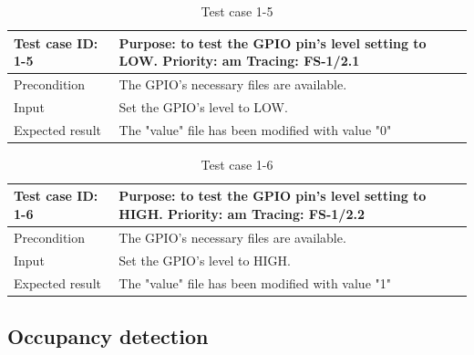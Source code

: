 \begin{table}[H]
	\caption{Test case 1-5}
	\label{table:TCase-FS1-5}
	\begin{center}
		\renewcommand{\arraystretch}{1.8}
		\begin{tabu} 
			to 0.9 \textwidth
			{  X[0.3, l] X[l] }
			\toprule
			Test case ID: 1-5 & Purpose: to test the GPIO pin's level setting to LOW. \newline Priority: am \newline Tracing: FS-1/2.1 \\ \midrule
			Precondition      & The GPIO's necessary files are available.                                                              \\
			Input             & Set the GPIO's level to LOW.                                                                           \\
			Expected result   & The "value" file has been modified with value "0"                                                      \\ \bottomrule
		\end{tabu}
	\end{center}
\end{table} 

\begin{table}[H]
	\caption{Test case 1-6}
	\label{table:TCase-FS1-6}
	\begin{center}
		\renewcommand{\arraystretch}{1.8}
		\begin{tabu} 
			to 0.9 \textwidth
			{  X[0.3, l] X[l] }
			\toprule
			Test case ID: 1-6 & Purpose: to test the GPIO pin's level setting to HIGH.  \newline Priority: am \newline Tracing: FS-1/2.2 \\ \midrule
			Precondition      & The GPIO's necessary files are available.                                                                \\
			Input             & Set the GPIO's level to HIGH.                                                                            \\
			Expected result   & The "value" file has been modified with value "1"                                                        \\ \bottomrule
		\end{tabu}
	\end{center}
\end{table} 

\subsection{Occupancy detection}

